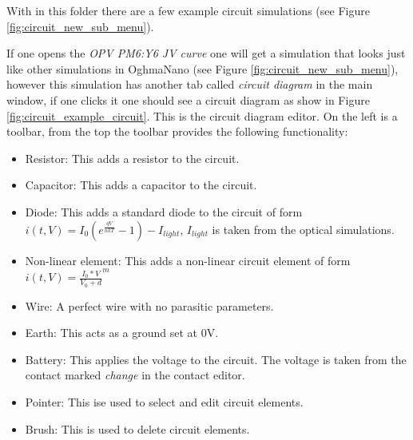 With in this folder there are a few example circuit simulations (see Figure \ref{fig:circuit_new_sub_menu}).

If one opens the \emph{OPV PM6:Y6 JV curve} one will get a simulation that looks just like other simulations in OghmaNano (see Figure \ref{fig:circuit_new_sub_menu}), however this simulation has another tab called \emph{circuit diagram} in the main window, if one clicks it one should see a circuit diagram as show in Figure \ref{fig:circuit_example_circuit}. This is the circuit diagram editor. On the left is a toolbar, from the top the toolbar provides the following functionality:

\begin{itemize}
	\vspace{-0.2cm}\item Resistor: This adds a resistor to the circuit.
	\vspace{-0.2cm}\item Capacitor: This adds a capacitor to the circuit.
	\vspace{-0.2cm}\item Diode: This adds a standard diode to the circuit of form $i(t,V)=I_{0}(e^{\frac{qV}{nkT}}-1)-I_{light}$, $I_{light}$ is taken from the optical simulations.
	\vspace{-0.2cm}\item Non-linear element: This adds a non-linear circuit element of form $i(t,V)={\frac{I_{0}*V}{V_{0}+d}}^m$
	\vspace{-0.2cm}\item Wire: A perfect wire with no parasitic parameters.
 	\vspace{-0.2cm}\item Earth: This acts as a ground set at 0V.
 	\vspace{-0.2cm}\item Battery: This applies the voltage to the circuit. The voltage is taken from the contact marked \emph{change} in the contact editor.
 	\vspace{-0.2cm}\item Pointer: This ise used to select and edit circuit elements.
 	\vspace{-0.2cm}\item Brush: This is used to delete circuit elements.
\end{itemize}

